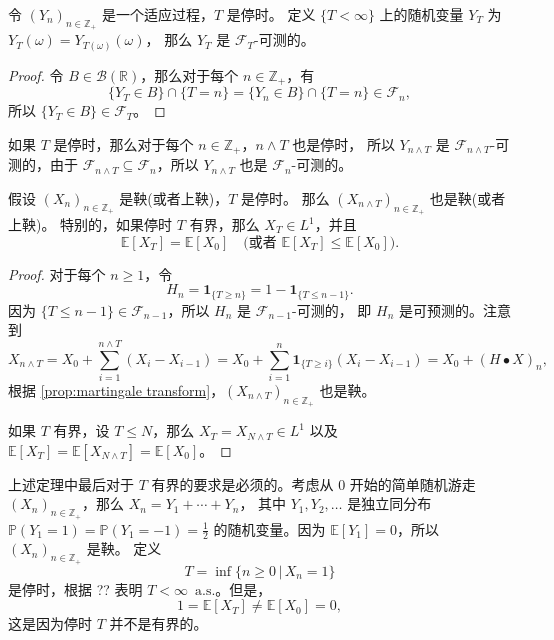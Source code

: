 \documentclass[fontset=none]{Notes}
\newcommand{\alsu}[1]{\text{$#1$ a.s.}}
\newcommand{\idf}{\mathbold 1}
\begin{document}
\begin{proposition}
  令 $(Y_n)_{n\in \mathbb{Z}_+}$ 是一个适应过程，$T$ 是停时。
  定义 $\{T<\infty\}$ 上的随机变量 $Y_T$ 为 $Y_T(\omega)=Y_{T(\omega)}(\omega)$，
  那么 $Y_T$ 是 $\mathcal{F}_T$-可测的。
\end{proposition}
\begin{proof}
  令 $B\in \mathcal{B}(\mathbb{R})$，那么对于每个 $n\in \mathbb{Z}_+$，有
  \[
    \{Y_T\in B\}\cap \{T=n\}=\{Y_n\in B\}\cap \{T=n\} \in \mathcal{F}_n,
  \]
  所以 $\{Y_T\in B\}\in \mathcal{F}_T$。
\end{proof}

如果 $T$ 是停时，那么对于每个 $n\in \mathbb{Z}_+$，$n\wedge T$ 也是停时，
所以 $Y_{n\wedge T}$ 是 $\mathcal{F}_{n\wedge T}$-可测的，由于
$\mathcal{F}_{n\wedge T}\subseteq \mathcal{F}_n$，所以 $Y_{n\wedge T}$
也是 $\mathcal{F}_n$-可测的。

\begin{theorem}[可选停时定理 1]
  假设 $(X_n)_{n\in \mathbb{Z}_+}$ 是鞅(或者上鞅)，$T$ 是停时。
  那么 $(X_{n\wedge T})_{n\in \mathbb{Z}_+}$ 也是鞅(或者上鞅)。
  特别的，如果停时 $T$ 有界，那么 $X_T\in L^1$，并且
  \[
    \mathbb{E}[X_T]=\mathbb{E}[X_0]\quad
    \bigl(\text{或者 } \mathbb{E}[X_T]\leq \mathbb{E}[X_0]\bigr).
  \]
\end{theorem}
\begin{proof}
  对于每个 $n\geq 1$，令
  \[
    H_n= \idf_{\{T\geq n\}}=1- \idf_{\{T\leq n-1\}}.
  \]
  因为 $\{T\leq n-1\}\in \mathcal{F}_{n-1}$，所以 $H_n$ 是 $\mathcal{F}_{n-1}$-可测的，
  即 $H_n$ 是可预测的。注意到
  \[
    X_{n\wedge T}=X_0+\sum_{i=1}^{n\wedge T}(X_i - X_{i-1})
    =X_0+\sum_{i=1}^n \idf_{\{T\geq i\}} (X_i - X_{i-1})=X_0+(H\bullet X)_n,
  \]
  根据 \autoref{prop:martingale transform}，$(X_{n\wedge T})_{n\in \mathbb{Z}_+}$
  也是鞅。
  
  如果 $T$ 有界，设 $T\leq N$，那么 $X_T=X_{N\wedge T}\in L^1$ 
  以及 $\mathbb{E}[X_T]=\mathbb{E}[X_{N\wedge T}]=\mathbb{E}[X_0]$。
\end{proof}

上述定理中最后对于 $T$ 有界的要求是必须的。考虑从 $0$ 开始的简单随机游走
$(X_n)_{n\in \mathbb{Z}_+}$，那么 $X_n=Y_1+\cdots+Y_n$，
其中 $Y_1,Y_2,\dots$ 是独立同分布 $\mathbb{P}(Y_1=1)=\mathbb{P}(Y_1=-1)=\frac{1}{2}$
的随机变量。因为 $\mathbb{E}[Y_1]=0$，所以 $(X_n)_{n\in \mathbb{Z}_+}$ 是鞅。
定义
\[
  T=\inf\{n\geq 0\,|\, X_n=1\}
\]
是停时，根据 ?? 表明 $T<\infty \,\alsu{}$。但是，
\[
  1=\mathbb{E}[X_T]\neq \mathbb{E}[X_0]=0,
\]
这是因为停时 $T$ 并不是有界的。
\end{document}
